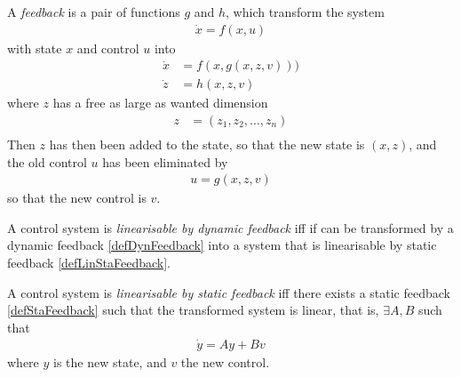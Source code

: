 \documentclass[12pt]{article}
\begin{document}
\begin{definition} \label{defDynFeedback}
  A \emph{feedback} is a pair of functions $g$ and $h$, which transform the system
  \begin{equation}\begin{aligned}
    \dot{x} = f(x,u)
  \end{aligned}\end{equation}
  with state $x$ and control $u$ into
  \begin{equation}\begin{aligned}
    \dot{x} &= f(x,g(x,z,v))) \\
    \dot{z} &= h(x,z,v)
  \end{aligned}\end{equation}
  where $z$ has a free as large as wanted dimension
  \begin{equation}\begin{aligned}
    z &= (z_1, z_2, \ldots, z_n) \\
  \end{aligned}\end{equation}
  Then $z$ has then been added to the state, so that the new state is $(x,z)$, and the old control $u$ has been eliminated by
  \begin{equation}\begin{aligned}
    u = g(x,z,v)
  \end{aligned}\end{equation}
  so that the new control is $v$.
\end{definition}

\begin{definition} \label{defLinDynFeedback}
  A control system is \emph{linearisable by dynamic feedback} iff if can be transformed by a dynamic
  feedback \ref{defDynFeedback} into a system that is linearisable by static feedback \ref{defLinStaFeedback}.
\end{definition}

\begin{definition} \label{defLinStaFeedback}
  A control system is \emph{linearisable by static feedback} iff there exists a static feedback
  \ref{defStaFeedback} such that the transformed system is linear, that is, $\exists A, B$ such that
  \begin{equation}\begin{aligned}
    \dot{y} = Ay + Bv
  \end{aligned}\end{equation}
  where $y$ is the new state, and $v$ the new control.
\end{definition}
\end{document}
